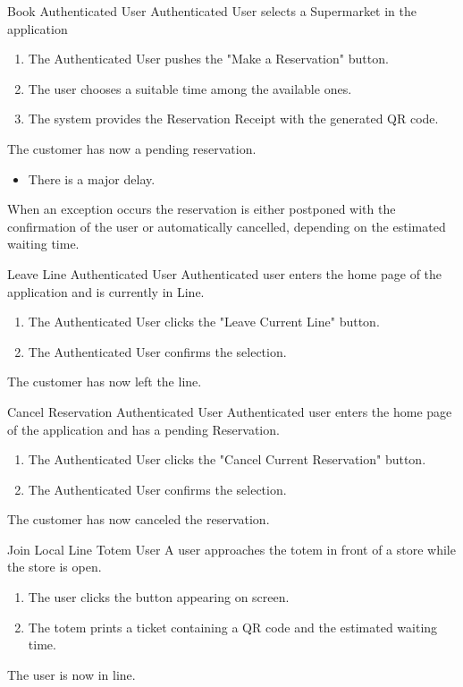 \usecase
{Book}
{Authenticated User}
{Authenticated User selects a Supermarket in the application}
{
        \begin{enumerate}
            \item The Authenticated User pushes the "Make a Reservation" button.
            \item The user chooses a suitable time among the available ones. 
            \item The system provides the Reservation Receipt with the generated QR code.
        \end{enumerate}
}
{
    The customer has now a pending reservation.
}
{
    \begin{itemize}
        \item There is a major delay.
    \end{itemize}
}
{
    When an exception occurs the reservation is either postponed with the confirmation of the user or automatically cancelled, depending on the estimated waiting time. 
}


\usecase
{Leave Line}
{Authenticated User}
{Authenticated user enters the home page of the application and is currently in Line.}
{
    \begin{enumerate}
        \item The Authenticated User clicks the "Leave Current Line" button.
        \item The Authenticated User confirms the selection.
    \end{enumerate}
}
{
    The customer has now left the line.
}
{}
{}

\usecase
{Cancel Reservation}
{Authenticated User}
{Authenticated user enters the home page of the application and has a pending Reservation.}
{
    \begin{enumerate}
        \item The Authenticated User clicks the "Cancel Current Reservation" button.
        \item The Authenticated User confirms the selection.
    \end{enumerate}
}
{
    The customer has now canceled the reservation.
}
{}
{}

\usecase
{Join Local Line}
{Totem User}
{A user approaches the totem in front of a store while the store is open.}
{
    \begin{enumerate}
        \item The user clicks the button appearing on screen.
        \item The totem prints a ticket containing a QR code and the estimated waiting time.
    \end{enumerate}
}
{
    The user is now in line.
}
{}
{}




